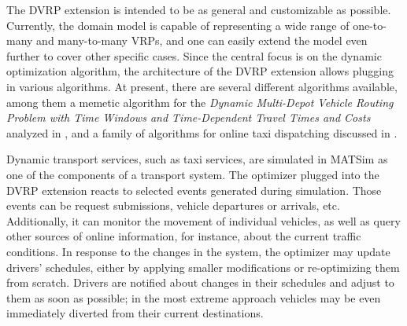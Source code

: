 
The DVRP extension is intended to be as general and customizable as possible. Currently, the domain model is capable of representing a wide range of one-to-many and many-to-many VRPs, and one can easily extend the model even further to cover other specific cases. Since the central focus is on the dynamic optimization algorithm, the architecture of the DVRP extension allows plugging in various algorithms. At present, there are several different algorithms available, among them a memetic algorithm for the \emph{Dynamic Multi-Depot Vehicle Routing Problem with Time Windows and Time-Dependent Travel Times and Costs} analyzed in \citep{MaciejewskiNagel2011DVRPMatsim}, and a family of algorithms for online taxi dispatching discussed in .

Dynamic transport services, such as taxi services, are simulated in MATSim as one of the components of a transport system. The optimizer plugged into the DVRP extension reacts to selected events generated during simulation. Those events can be request submissions, vehicle departures or arrivals, etc. Additionally, it can monitor the movement of individual vehicles, as well as query other sources of online information, for instance, about the current traffic conditions. In response to the changes in the system, the optimizer may update drivers' schedules, either by applying smaller modifications or re-optimizing them from scratch. Drivers are notified about changes in their schedules and adjust to them as soon as possible; in the most extreme approach vehicles may be even immediately diverted from their current destinations.


